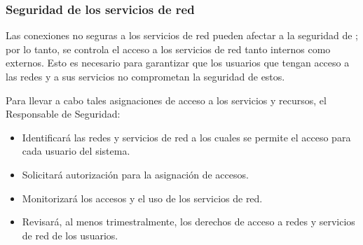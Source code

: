 
\subsubsection{Seguridad de los servicios de red}

Las conexiones no seguras a los servicios de red pueden afectar a la seguridad de \Beneficiario{}; por lo tanto, se controla el acceso a los servicios de red tanto internos como externos. Esto es necesario para garantizar que los usuarios que tengan acceso a las redes y a sus servicios no comprometan la seguridad de estos.

Para llevar a cabo tales asignaciones de acceso a los servicios y recursos, el Responsable de Seguridad:

\begin{itemize}
    \item Identificará las redes y servicios de red a los cuales se permite el acceso para cada usuario del sistema.
    \item Solicitará autorización para la asignación de accesos.
    \item Monitorizará los accesos y el uso de los servicios de red.
    \item Revisará, al menos trimestralmente, los derechos de acceso a redes y servicios de red de los usuarios.
\end{itemize}

